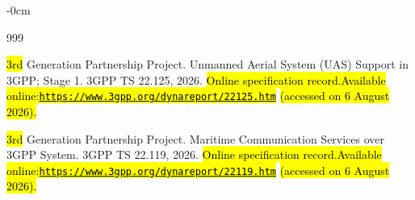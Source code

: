 \documentclass[blockchains,review,accept,moreauthors]{Definitions/mdpi}
\begin{document}
\begin{adjustwidth}{-\extralength}{0cm}
\begin{thebibliography}{999}

{\hl{3rd} %
 Generation Partnership Project}.
\newblock Unmanned Aerial System ({UAS}) Support in {3GPP}; Stage 1.
\newblock 3GPP TS 22.125,  2026.
\newblock \hl{Online specification record.}\space \hl{Available online:}\space \href{https://www.3gpp.org/dynareport/22125.htm}{\hl{\mbox{\nolinkurl{https://www.3gpp.org/}}}}\allowbreak\href{https://www.3gpp.org/dynareport/22125.htm}{\hl{\mbox{\nolinkurl{dynareport/}}}}\allowbreak\href{https://www.3gpp.org/dynareport/22125.htm}{\hl{\mbox{\nolinkurl{22125.htm}}}} \space\hl{(accessed on 6 August 2026).}

{\hl{3rd} %
 Generation Partnership Project}.
\newblock Maritime Communication Services over {3GPP} System.
\newblock 3GPP TS 22.119,  2026.
\newblock \hl{Online specification record.}\space \hl{Available online:}\space \href{https://www.3gpp.org/dynareport/22119.htm}{\hl{\mbox{\nolinkurl{https://www.3gpp.org/}}}}\allowbreak\href{https://www.3gpp.org/dynareport/22119.htm}{\hl{\mbox{\nolinkurl{dynareport/}}}}\allowbreak\href{https://www.3gpp.org/dynareport/22119.htm}{\hl{\mbox{\nolinkurl{22119.htm}}}} \space\hl{(accessed on 6 August 2026).}


\end{thebibliography}
\end{adjustwidth}
\end{document}

